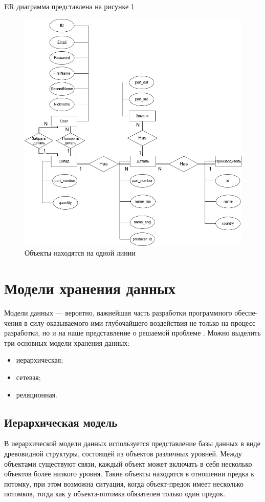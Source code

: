 ER диаграмма представлена на рисунке \ref{img:er-diargram}
\begin{center}
	\begin{figure}[H]
		\centering
		\includegraphics[scale=0.5]{inc/img/er-diagram.png}
		\caption{Объекты находятся на одной линии}
		\label{img:er-diargram}
	\end{figure}
\end{center}

\section{Модели хранения данных}

Модели данных — вероятно, важнейшая часть разработки программного обеспе-
чения в силу оказываемого ими глубочайшего воздействия не только на процесс
разработки, но и на наше представление о решаемой проблеме \cite{kleppman}.
Можно выделить три основных модели хранения данных:
\begin{itemize}
	\item иерархическая;
	\item сетевая;
	\item реляционная.
\end{itemize}

\subsection{Иерархическая модель}
В иерархической модели данных используется представление базы данных в виде древовидной структуры, состоящей из объектов различных уровней. Между объектами существуют связи, каждый объект может включать в себя несколько объектов более низкого уровня. Такие объекты находятся в отношении предка к потомку, при этом возможна ситуация, когда объект-предок имеет несколько потомков, тогда как у объекта-потомка обязателен только один предок.

